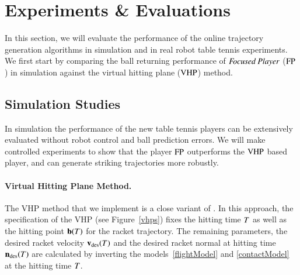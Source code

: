 \section{Experiments \& Evaluations}\label{results}

In this section, we will evaluate the performance of the online trajectory generation algorithms in simulation and in real robot table tennis experiments. We first start by comparing the ball returning performance of $\emph{Focused Player}$ ($\mathrm{FP}$) in simulation against the virtual hitting plane ($\mathrm{VHP}$) method. 

\subsection{Simulation Studies}\label{sim} %

In simulation the performance of the new table tennis players can be extensively evaluated without robot control and ball prediction errors. We will make controlled experiments to show that the player $\mathrm{FP}$ outperforms the $\mathrm{VHP}$ based player, and can generate striking trajectories more robustly.

\paragraph{\textbf{Virtual Hitting Plane Method}.} The VHP method that we implement is a close variant of \citet{Muelling11}. In this approach, the specification of the VHP (see Figure~\ref{vhps}) fixes the hitting time $T$ as well as the hitting point $\boldsymbol{\mathrm{b}}(T)$ for the racket trajectory. The remaining parameters, the desired racket velocity $\boldsymbol{\mathrm{v}}_{\mathrm{des}}(T)$ and the desired racket normal at hitting time $\boldsymbol{\mathrm{n}}_{\mathrm{des}}(T)$ are calculated by inverting the models~\eqref{flightModel} and \eqref{contactModel} at the hitting time $T$. 

%

